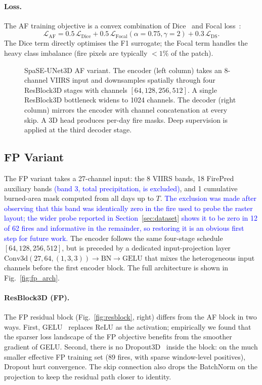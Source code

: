 \documentclass[sensors,article,submit,moreauthors,pdftex]{Definitions/mdpi}
\newcommand{\rev}[1]{\textcolor{blue}{#1}}
\begin{document}
\paragraph*{Loss.} The AF training objective is a convex combination of Dice~\cite{milletari2016v} and Focal loss~\cite{lin2017focal}:
\begin{equation}
\mathcal{L}_{\mathrm{AF}} \!=\! 0.5\, \mathcal{L}_{\mathrm{Dice}} + 0.5\, \mathcal{L}_{\mathrm{Focal}}(\alpha\!=\!0.75,\gamma\!=\!2) + 0.3\,\mathcal{L}_{\mathrm{DS}}.
\end{equation}
The Dice term directly optimises the F1 surrogate; the Focal term handles the heavy class imbalance (fire pixels are typically $<1\%$ of the patch).

\begin{figure}[h]
\centering

\caption{SpaSE-UNet3D AF variant. The encoder (left column) takes an 8-channel VIIRS input and downsamples spatially through four ResBlock3D stages with channels $[64, 128, 256, 512]$. A single ResBlock3D bottleneck widens to 1024 channels. The decoder (right column) mirrors the encoder with channel concatenation at every skip. A 3D head produces per-day fire masks. Deep supervision is applied at the third decoder stage.}
\label{fig:af_arch}
\end{figure}

\subsection{FP Variant}

The FP variant takes a 27-channel input: the 8 VIIRS bands, 18 FirePred auxiliary bands \rev{(band 3, total precipitation, is excluded)}, and 1 cumulative burned-area mask computed from all days up to $T$. \rev{The exclusion was made after observing that this band was identically zero in the fire used to probe the raster layout; the wider probe reported in Section~\ref{sec:dataset} shows it to be zero in 12 of 62 fires and informative in the remainder, so restoring it is an obvious first step for future work.} The encoder follows the same four-stage schedule $[64, 128, 256, 512]$, but is preceded by a dedicated input-projection layer $\mathrm{Conv3d}(27, 64, (1, 3, 3)) \to \mathrm{BN} \to \mathrm{GELU}$ that mixes the heterogeneous input channels before the first encoder block. The full architecture is shown in Fig.~\ref{fig:fp_arch}.

\paragraph*{ResBlock3D (FP).} The FP residual block (Fig.~\ref{fig:resblock}, right) differs from the AF block in two ways. First, GELU~\cite{hendrycks2016gaussian} replaces ReLU as the activation; empirically we found that the sparser loss landscape of the FP objective benefits from the smoother gradient of GELU. Second, there is no Dropout3D~\cite{srivastava2014dropout} inside the block: on the much smaller effective FP training set (89 fires, with sparse window-level positives), Dropout hurt convergence. The skip connection also drops the BatchNorm on the projection to keep the residual path closer to identity.
\end{document}
